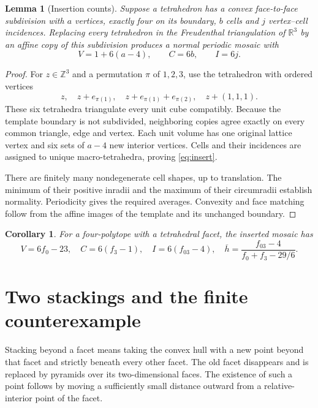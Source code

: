 \documentclass[11pt,a4paper]{article}
\newtheorem{lemma}[theorem]{Lemma}
\newtheorem{corollary}[theorem]{Corollary}
\theoremstyle{definition}\newtheorem{definition}[theorem]{Definition}
\theoremstyle{remark}\newtheorem{remark}[theorem]{Remark}
\newcommand{\R}{\mathbb R}\newcommand{\Z}{\mathbb Z}\newcommand{\conv}{\operatorname{conv}}
\newcommand{\hbarM}{\overline h}\newcommand{\nbar}{\overline n}\newcommand{\vbar}{\overline v}
\begin{document}
\begin{lemma}[Insertion counts]\label{lem:insert}
Suppose a tetrahedron has a convex face-to-face subdivision with \(a\) vertices, exactly four on its boundary, \(b\) cells and \(j\) vertex--cell incidences. Replacing every tetrahedron in the Freudenthal triangulation of \(\R^3\) by an affine copy of this subdivision produces a normal periodic mosaic with
\begin{equation}\label{eq:insert}
 V=1+6(a-4),\qquad C=6b,\qquad I=6j.
\end{equation}
\end{lemma}
\begin{proof}
For \(z\in\Z^3\) and a permutation \(\pi\) of \(1,2,3\), use the tetrahedron with ordered vertices
\[
 z,\quad z+e_{\pi(1)},\quad z+e_{\pi(1)}+e_{\pi(2)},\quad z+(1,1,1).
\]
These six tetrahedra triangulate every unit cube compatibly. Because the template boundary is not subdivided, neighboring copies agree exactly on every common triangle, edge and vertex. Each unit volume has one original lattice vertex and six sets of \(a-4\) new interior vertices. Cells and their incidences are assigned to unique macro-tetrahedra, proving \eqref{eq:insert}.

There are finitely many nondegenerate cell shapes, up to translation. The minimum of their positive inradii and the maximum of their circumradii establish normality. Periodicity gives the required averages. Convexity and face matching follow from the affine images of the template and its unchanged boundary.
\end{proof}

\begin{corollary}\label{cor:polytocount}
For a four-polytope with a tetrahedral facet, the inserted mosaic has
\begin{equation}\label{eq:polytocount}
 V=6f_0-23,\quad C=6(f_3-1),\quad I=6(f_{03}-4),\quad
 \hbarM=\frac{f_{03}-4}{f_0+f_3-29/6}.
\end{equation}
\end{corollary}

\section{Two stackings and the finite counterexample}
Stacking beyond a facet means taking the convex hull with a new point beyond that facet and strictly beneath every other facet. The old facet disappears and is replaced by pyramids over its two-dimensional faces. The existence of such a point follows by moving a sufficiently small distance outward from a relative-interior point of the facet.
\end{document}
